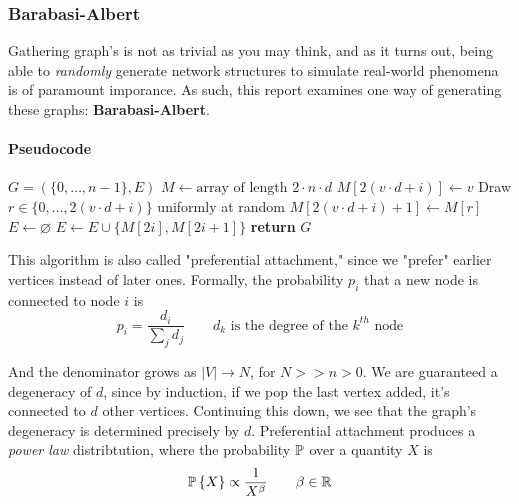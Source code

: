 \subsubsection{Barabasi-Albert}
Gathering graph's is not as trivial as you may think, and as it turns out, being
able to \textit{randomly} generate network structures to simulate real-world
phenomena is of paramount imporance. As such, this report examines one way of 
generating these graphs: \textbf{Barabasi-Albert}. 


\paragraph{Pseudocode}
\begin{algorithm}[H]
    \caption{Barabási-Albert (Preferential Attachment)}\label{alg:pa}
    \begin{algorithmic}[1] %
        \State $G = (\{0, \dots, n - 1\}, E)$
        \State $M \gets \text{array of length } 2 \cdot n \cdot d$
                \State $M[2(v \cdot d + i)] \gets v$
                \State Draw $r \in \{0, \dots, 2(v \cdot d + i)\}$ uniformly at random
                \State $M[2(v \cdot d + i) + 1] \gets M[r]$
            \EndFor
        \EndFor
        \State $E \gets \varnothing$
            \State $E \gets E \cup \{M[2i], M[2i + 1]\}$
        \EndFor
        \State \textbf{return} $G$
        \EndProcedure
    \end{algorithmic}
\end{algorithm}

This algorithm is also called "preferential attachment," since we "prefer" earlier
vertices instead of later ones. Formally, the probability $p_i$ that a new node 
is connected to node $i$ is
\begin{equation*}
	p_i = \frac{d_i}{\sum_j d_j} \qquad d_k \text{ is the degree of the 
	$k^{th}$ node} 
\end{equation*}

And the denominator grows as $|V| \rightarrow N$, for $N >> n > 0$. We are guaranteed a degeneracy of $d$, since by  induction, if we pop the last vertex added, 
it's connected to $d$ other vertices. Continuing this down, we see that the graph's 
degeneracy is determined precisely by $d$. Preferential attachment produces a 
\textit{power law} distribtution, where the probability $\mathbb{P}$ over a quantity $X$ 
is
\begin{equation*}
	\mathbb{P} \left\{ X \right\} \propto \frac{1}{X^\beta} \qquad \beta \in \mathbb{R}
\end{equation*}
\newpage
